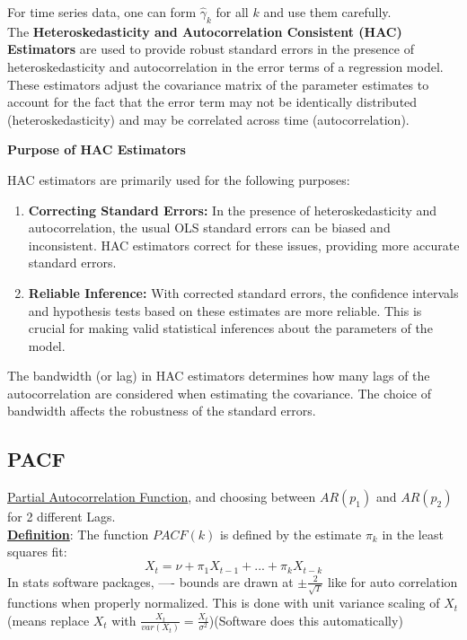 For time series data, one can form $\hat{\gamma}_k$ for all $k$ and use them carefully. \\

The \textbf{Heteroskedasticity and Autocorrelation Consistent (HAC) Estimators} are used to provide robust standard errors in the presence of heteroskedasticity and autocorrelation in the error terms of a regression model. These estimators adjust the covariance matrix of the parameter estimates to account for the fact that the error term may not be identically distributed (heteroskedasticity) and may be correlated across time (autocorrelation).

\textbf{Purpose of HAC Estimators}

HAC estimators are primarily used for the following purposes:
\begin{enumerate}
    \item \textbf{Correcting Standard Errors:} In the presence of heteroskedasticity and autocorrelation, the usual OLS standard errors can be biased and inconsistent. HAC estimators correct for these issues, providing more accurate standard errors.
    \item \textbf{Reliable Inference:} With corrected standard errors, the confidence intervals and hypothesis tests based on these estimates are more reliable. This is crucial for making valid statistical inferences about the parameters of the model.
\end{enumerate}
The bandwidth (or lag) in HAC estimators determines how many lags of the autocorrelation are considered when estimating the covariance. The choice of bandwidth affects the robustness of the standard errors.

\subsection{PACF}

\underline{Partial Autocorrelation Function}, and choosing between $AR(p_1)$ and $AR(p_2)$ for 2 different Lags. \\

\textbf{\underline{Definition}}: \quad The function $PACF(k)$ is defined by the estimate $\pi_k$ in the least squares fit: \[
X_t=\nu +\pi_1 X_{t-1} +...+ \pi_k X_{t-k}
\]
In stats software packages, ---- bounds are drawn at $\pm \frac{2}{\sqrt{T}}$ like for auto correlation functions when properly normalized. This is done with unit variance scaling of $X_t$ (means replace $X_t$ with $\frac{X_t}{var(X_t)}=\frac{X_t}{\sigma^2}$)(Software does this automatically)

